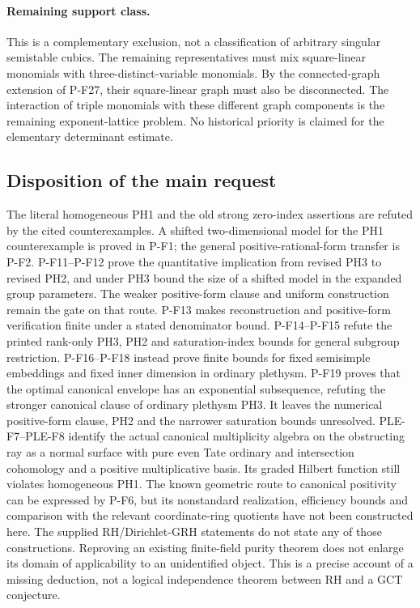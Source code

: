 \documentclass[11pt,a4paper]{article}
\begin{document}
\paragraph{Remaining support class.}
This is a complementary exclusion, not a classification
of arbitrary singular semistable cubics. The remaining
representatives must mix square-linear monomials with
three-distinct-variable monomials. By the connected-graph
extension of P-F27, their square-linear graph must also
be disconnected. The interaction of triple monomials
with these different graph components is the remaining
exponent-lattice problem. No historical priority is
claimed for the elementary determinant estimate.


\subsection{Disposition of the main request}
The literal homogeneous PH1 and the old strong zero-index assertions
are refuted by the cited counterexamples. A shifted two-dimensional
model for the PH1 counterexample is proved in P-F1; the general
positive-rational-form transfer is P-F2. P-F11--P-F12 prove the
quantitative implication from revised PH3 to revised PH2, and under
PH3 bound the size of a shifted model in the expanded group parameters.
The weaker positive-form clause and uniform construction remain the
gate on that route. P-F13 makes reconstruction and positive-form verification
finite under a stated denominator bound. P-F14--P-F15 refute the
printed rank-only PH3, PH2 and saturation-index bounds for general
subgroup restriction. P-F16--P-F18 instead prove finite bounds for
fixed semisimple embeddings and fixed inner dimension in ordinary
plethysm. P-F19 proves that the optimal canonical envelope has an
exponential subsequence, refuting the stronger canonical clause of
ordinary plethysm PH3. It leaves the numerical positive-form clause,
PH2 and the narrower saturation bounds unresolved.
PLE-F7--PLE-F8 identify the actual canonical multiplicity algebra on
the obstructing ray as a normal surface with pure even Tate ordinary
and intersection cohomology and a positive multiplicative basis.
Its graded Hilbert function still violates homogeneous PH1.
The known geometric route to
canonical positivity can be expressed by P-F6, but its nonstandard
realization, efficiency bounds and comparison with the relevant
coordinate-ring quotients have not been constructed here.
The supplied RH/Dirichlet-GRH statements do not state any of those
constructions. Reproving an existing finite-field purity theorem does
not enlarge its domain of applicability to an unidentified object.
This is a precise account of a missing deduction, not a logical
independence theorem between RH and a GCT conjecture.
\end{document}
